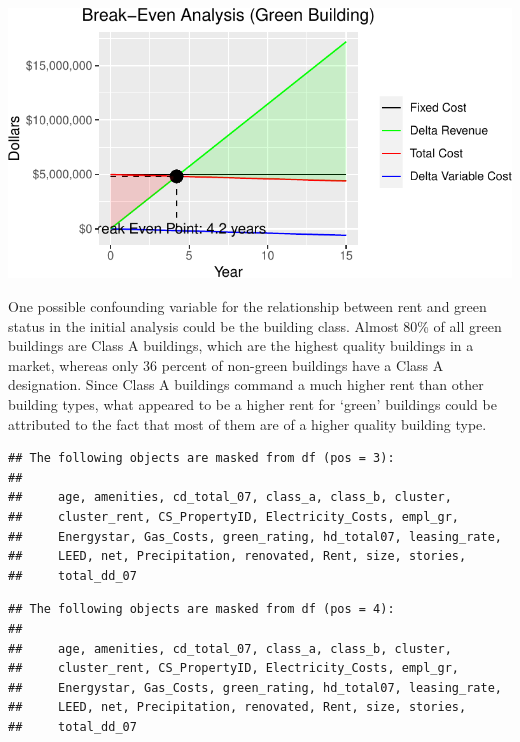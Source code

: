 \documentclass[
]{article}
\begin{document}
\begin{center}\includegraphics{STA380Exercises_Ofunrein_Pflum_Robinson_Vincent_files/figure-latex/unnamed-chunk-6-1} \end{center}

One possible confounding variable for the relationship between rent and
green status in the initial analysis could be the building class. Almost
80\% of all green buildings are Class A buildings, which are the highest
quality buildings in a market, whereas only 36 percent of non-green
buildings have a Class A designation. Since Class A buildings command a
much higher rent than other building types, what appeared to be a higher
rent for `green' buildings could be attributed to the fact that most of
them are of a higher quality building type.

\begin{verbatim}
## The following objects are masked from df (pos = 3):
## 
##     age, amenities, cd_total_07, class_a, class_b, cluster,
##     cluster_rent, CS_PropertyID, Electricity_Costs, empl_gr,
##     Energystar, Gas_Costs, green_rating, hd_total07, leasing_rate,
##     LEED, net, Precipitation, renovated, Rent, size, stories,
##     total_dd_07
\end{verbatim}

\begin{verbatim}
## The following objects are masked from df (pos = 4):
## 
##     age, amenities, cd_total_07, class_a, class_b, cluster,
##     cluster_rent, CS_PropertyID, Electricity_Costs, empl_gr,
##     Energystar, Gas_Costs, green_rating, hd_total07, leasing_rate,
##     LEED, net, Precipitation, renovated, Rent, size, stories,
##     total_dd_07
\end{verbatim}
\end{document}
